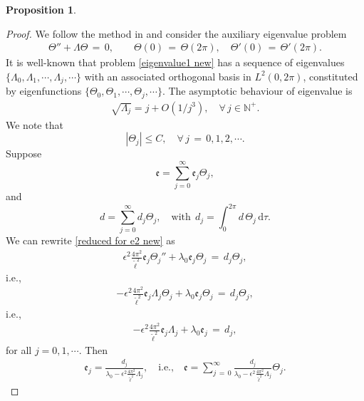 \documentclass[10pt, reqno]{amsart}
\numberwithin{equation}{section}
\newtheorem{proposition}[theorem]{Proposition}
\theoremstyle{definition}
\begin{document}
{\begin{proposition}
\end{proposition}

\begin{proof}
We follow the method in \cite{delPKowWei1} and consider the auxiliary eigenvalue problem
\begin{align} \label{eigenvalue1 new}
 \Theta'' + \Lambda\Theta \,=\, 0,
 \qquad
 \Theta(0) \,=\, \Theta(2\pi), \quad \Theta'(0) \,=\, \Theta' (2\pi).
\end{align}
 It is well-known that problem \eqref{eigenvalue1 new} has a sequence of eigenvalues $\big\{\Lambda_0, \Lambda_1, \cdots, \Lambda_j,\cdots\big\}$
 with an associated orthogonal basis in $L^2(0, 2\pi)$, constituted by eigenfunctions $\big\{\Theta_0, \Theta_1, \cdots, \Theta_j,\cdots\big\} $.
 The asymptotic behaviour of eigenvalue is
\begin{align} \label{Lambda_k asymptotic behavior}
\sqrt{ \Lambda_j } =j+O(1/j^3), \quad \forall\,j\in {\mathbb N}^{+} .
\end{align}
 We note that
\[
|\Theta_j|\leq C, \quad \forall\,j \,=\, 0, 1, 2, \cdots.
\]
Suppose
\[
{\mathfrak e} = \sum_{j=0}^\infty {\mathfrak e}_j \Theta_j,
\]
and
\[
d = \sum_{j=0}^\infty d_j \Theta_j, \quad \text{with}~~ d_j = \int_0^{2\pi} d\, \Theta_j \,{\mathrm d}\tau.
\]
We can rewrite \eqref{reduced for e2 new} as
\begin{align*}
\epsilon^2\frac{4\pi^2}{{\tilde\ell}^2} {\mathfrak e}_j \Theta_j'' + \lambda_0 {\mathfrak e}_j \Theta_j \,=\, d_j \Theta_j,
\end{align*}
i.e.,
\begin{align*}
-\epsilon^2\frac{4\pi^2}{{\tilde\ell}^2} {\mathfrak e}_j \Lambda_j\Theta_j + \lambda_0 {\mathfrak e}_j \Theta_j \,=\, d_j \Theta_j,
\end{align*}
i.e.,
\begin{align*}
-\epsilon^2\frac{4\pi^2}{{\tilde\ell}^2} {\mathfrak e}_j \Lambda_j + \lambda_0 {\mathfrak e}_j \,=\, d_j,
\end{align*}
for all $j=0,1,\cdots$.
Then
\begin{align*}
{\mathfrak e}_j = \frac{d_j} {\lambda_0 - \epsilon^2\frac{4\pi^2}{{\tilde\ell}^2} \Lambda_j},
\quad \text{i.e.,}\quad
{\mathfrak e}= \sum_{j \,=\, 0}^\infty \frac{d_j} {\lambda_0 - \epsilon^2\frac{4\pi^2}{{\tilde\ell}^2}\Lambda_j} \Theta_j.

\end{align*}
\end{proof}}
\end{document}
